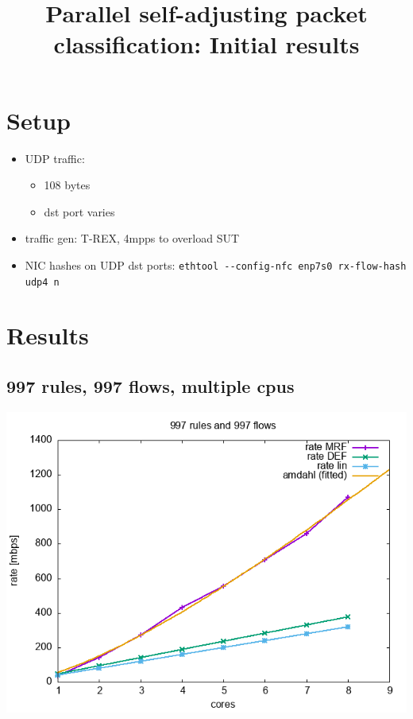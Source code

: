 \documentclass[11pt]{article}
\date{}
\title{Parallel self-adjusting packet classification: Initial results}
\begin{document}
\maketitle
{}
\frenchspacing

\section*{Setup}
\label{sec:org3e5ed48}
\begin{itemize}
\item UDP traffic:
\begin{itemize}
\item 108 bytes
\item dst port varies
\end{itemize}
\item traffic gen: T-REX, 4mpps to overload SUT
\item NIC hashes on UDP dst ports: \texttt{ethtool -{}-{}config-nfc enp7s0 rx-flow-hash udp4 n}
\end{itemize}

\section*{Results}
\label{sec:org6f240f3}
\subsection*{997 rules, 997 flows, multiple cpus}
\label{sec:org5846b41}
\begin{center}
\includegraphics[width=.9\linewidth]{plot-997rules-997flows.png}
\end{center}
\end{document}
